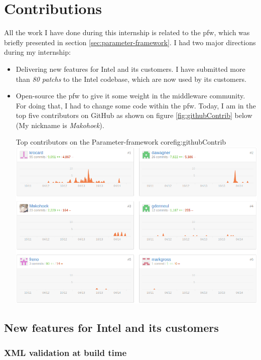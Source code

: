 \chapter{Contributions}\label{chap:contributions}

All the work I have done during this internship is related to the \gls{pfw},
which was briefly presented in section \ref{sec:parameter-framework}.
I had two major directions during my internship:
\begin{itemize}
    \item Delivering new features for Intel and its customers.
        I have submitted more than \emph{80 patchs} to the Intel codebase, which are now used by its customers.
    \item Open-source the \gls{pfw} to give it some weight in the middleware community.
        For doing that, I had to change some code within the \gls{pfw}.
        Today, I am in the top five contributors on GitHub as shown on figure \ref{fig:githubContrib} below (My nickname is \emph{Makohoek}).
        \begin{figureGraphics}{Top contributors on the Parameter-framework core}{fig:githubContrib}
            \includegraphics[width=\textwidth]{./src/img/statsGitHub.png}
        \end{figureGraphics}
\end{itemize}

\section{New features for Intel and its customers}

\subsection{XML validation at build time}


